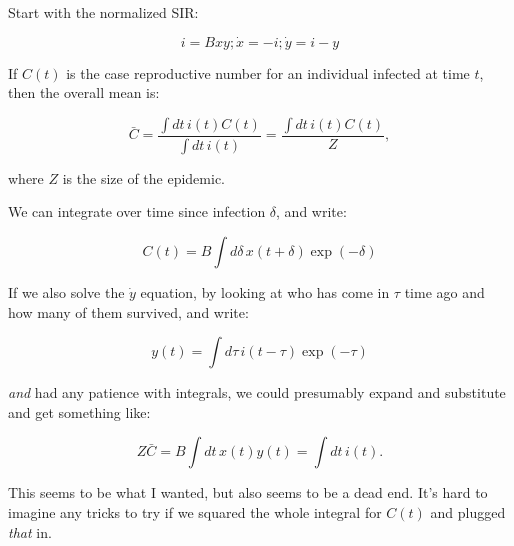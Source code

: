 \documentclass[12pt]{article}
\begin{document}
Start with the normalized SIR:

$$ i = Bxy; \dot x = -i; \dot y = i-y $$

If $C(t)$ is the case reproductive number for an individual infected at time $t$, then the overall mean is:

$$
	\bar C 
	= \frac{\int{dt\, i(t) C(t)}}{\int{dt\, i(t)}}
	= \frac{\int{dt\, i(t) C(t)}}{Z}, 
$$

where $Z$ is the size of the epidemic.

We can integrate over time since infection $\delta$, and write:

$$C(t) = B \int{d\delta\, x(t+\delta) \exp(-\delta)}$$

If we also solve the $\dot y$ equation, by looking at who has come in $\tau$ time ago and how many of them survived, and write:

$$ y(t) = \int{d\tau\, i(t-\tau)\exp(-\tau)}$$

\emph{and} had any patience with integrals, we could presumably expand and substitute and get something like: 

$$
	Z \bar C  = B \int{dt\, x(t) y(t)} = \int{dt\, i(t)}.
$$

This seems to be what I wanted, but also seems to be a dead end. It's hard to imagine any tricks to try if we squared the whole integral for $C(t)$ and plugged \emph{that} in.
\end{document}
